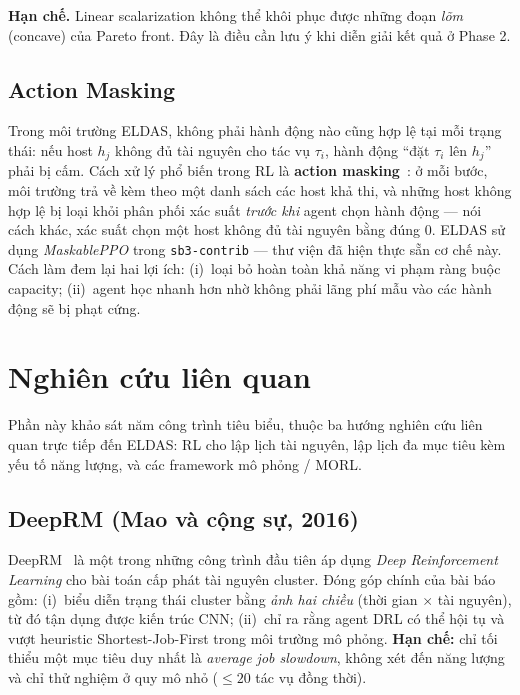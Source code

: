 \textbf{Hạn chế.} Linear scalarization không thể khôi phục được những
đoạn \textit{lõm} (concave) của Pareto front. Đây là điều cần lưu ý khi
diễn giải kết quả ở Phase 2.

\subsection{Action Masking}
Trong môi trường ELDAS, không phải hành động nào cũng hợp lệ tại mỗi
trạng thái: nếu host $h_j$ không đủ tài nguyên cho tác vụ $\tau_i$, hành
động ``đặt $\tau_i$ lên $h_j$'' phải bị cấm. Cách xử lý phổ biến trong
RL là \textbf{action masking}~\cite{huang2022maskable}: ở mỗi bước, môi
trường trả về kèm theo một danh sách các host khả thi, và những host
không hợp lệ bị loại khỏi phân phối xác suất \emph{trước khi} agent
chọn hành động --- nói cách khác, xác suất chọn một host không đủ tài
nguyên bằng đúng $0$. ELDAS sử dụng \textit{MaskablePPO} trong
\texttt{sb3-contrib} --- thư viện đã hiện thực sẵn cơ chế này. Cách
làm đem lại hai lợi ích: (i)~loại bỏ hoàn toàn khả năng vi phạm ràng
buộc capacity; (ii)~agent học nhanh hơn nhờ không phải lãng phí mẫu
vào các hành động sẽ bị phạt cứng.

\section{Nghiên cứu liên quan}
\label{sec:related-work}

Phần này khảo sát năm công trình tiêu biểu, thuộc ba hướng nghiên cứu
liên quan trực tiếp đến ELDAS: RL cho lập lịch tài nguyên, lập lịch đa
mục tiêu kèm yếu tố năng lượng, và các framework mô phỏng / MORL.

\subsection{DeepRM (Mao và cộng sự, 2016)}
DeepRM~\cite{mao2016resource} là một trong những công trình đầu tiên áp
dụng \textit{Deep Reinforcement Learning} cho bài toán cấp phát tài
nguyên cluster. Đóng góp chính của bài báo gồm: (i)~biểu diễn trạng
thái cluster bằng \textit{ảnh hai chiều} (thời gian $\times$ tài
nguyên), từ đó tận dụng được kiến trúc CNN; (ii)~chỉ ra rằng agent DRL
có thể hội tụ và vượt heuristic Shortest-Job-First trong môi trường mô
phỏng. \textbf{Hạn chế:} chỉ tối thiểu một mục tiêu duy nhất là
\textit{average job slowdown}, không xét đến năng lượng và chỉ thử
nghiệm ở quy mô nhỏ ($\le 20$ tác vụ đồng thời).

